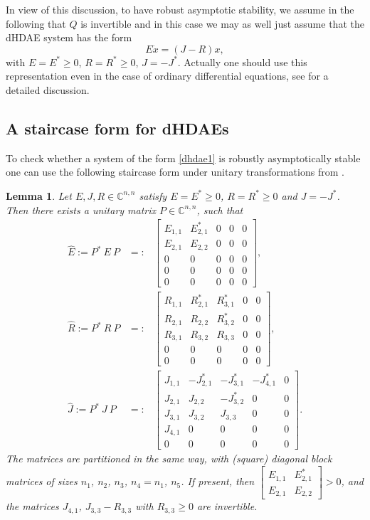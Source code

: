 \documentclass[11pt]{article}
\newtheorem{lemma}[theorem]{Lemma}
\begin{document}
In view of this discussion, to have robust asymptotic stability, we assume in the following that $Q$ is invertible and in this case we may as well just assume that the dHDAE system has the form
%
\begin{equation}\label{dhdae1}
E\dot x=(J-R) x,
\end{equation}
%
with $E=E^*\geq 0$, $R=R^*\geq 0$, $J=-J^*$. Actually one should use this representation  even in the case of ordinary differential equations, see \cite{MehU23} for a detailed discussion.

\subsection{A staircase form for dHDAEs}\label{sec:staircase}


To check whether a system of the form \eqref{dhdae1} is robustly asymptotically stable
one can use the following staircase form under unitary transformations from \cite{AchAM21}.
%
\begin{lemma}\label{lem:tSF}
Let $E,J,R\in\mathbb C^{n,n}$ satisfy $E=E^*\geq 0$, $R=R^*\geq 0$ and $J=-J^*$.
Then there exists a unitary matrix $P\in\mathbb C^{n,n}$, such that
%
\begin{eqnarray}
\hat E :=P^*\ E\ P
&=:&\begin{bmatrix}
E_{1,1} & E_{2,1}^* & 0 & 0 & 0 \\
E_{2,1} & E_{2,2} & 0 & 0 & 0 \\
0  & 0 & 0 & 0 & 0 \\
0  & 0 & 0 & 0 & 0 \\
0  & 0 & 0 & 0 & 0
\end{bmatrix}, \nonumber\\
%
\hat R :=P^*\ R\ P
&=:&\begin{bmatrix}
R_{1,1} & R_{2,1}^* & R_{3,1}^*& 0 & 0 \\
R_{2,1} & R_{2,2} & R_{3,2}^* &0 & 0  \\
R_{3,1} & R_{3,2} & R_{3,3} &0 & 0 \\
0  & 0 & 0 & 0 & 0 \\
0  & 0 & 0 & 0 & 0
\end{bmatrix}, \label{staircase:EJR} \\
%
\hat J :=P^*\ J\ P
&=:&\begin{bmatrix}
J_{1,1} & -J_{2,1}^* & -J_{3,1}^* & -J_{4,1}^* & 0\\
J_{2,1} & J_{2,2} & -J_{3,2}^*& 0 & 0\\
J_{3,1} & J_{3,2} & J_{3,3}&  0 & 0\\
J_{4,1} & 0& 0 & 0 &0\\
 0 & 0 & 0 & 0 & 0
\end{bmatrix}.
\nonumber
\end{eqnarray}
%
The matrices are partitioned in the same way, with (square) diagonal block matrices of sizes $n_1$, $n_2$, $n_3$, $n_4=n_1$, $n_5$.
If present, then $
\begin{bmatrix} E_{1,1} & E_{2,1}^* \\ E_{2,1} & E_{2,2}  \end{bmatrix}>0
$, and the matrices $J_{4,1}$, $J_{3,3}-R_{3,3}$ with $R_{3,3}\geq 0$ are invertible.
\end{lemma}
\end{document}
